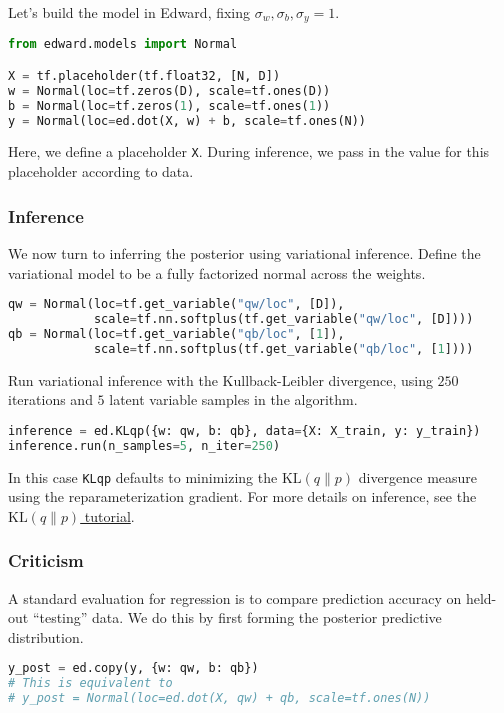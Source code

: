 Let's build the model in Edward, fixing $\sigma_w,\sigma_b,\sigma_y=1$.
\begin{lstlisting}[language=Python]
from edward.models import Normal

X = tf.placeholder(tf.float32, [N, D])
w = Normal(loc=tf.zeros(D), scale=tf.ones(D))
b = Normal(loc=tf.zeros(1), scale=tf.ones(1))
y = Normal(loc=ed.dot(X, w) + b, scale=tf.ones(N))
\end{lstlisting}
Here, we define a placeholder \texttt{X}. During inference, we pass in
the value for this placeholder according to data.

\subsubsection{Inference}

We now turn to inferring the posterior using variational inference.
Define the variational model to be a fully factorized normal across
the weights.
\begin{lstlisting}[language=Python]
qw = Normal(loc=tf.get_variable("qw/loc", [D]),
            scale=tf.nn.softplus(tf.get_variable("qw/loc", [D])))
qb = Normal(loc=tf.get_variable("qb/loc", [1]),
            scale=tf.nn.softplus(tf.get_variable("qb/loc", [1])))
\end{lstlisting}

Run variational inference with the Kullback-Leibler divergence, using
$250$ iterations and $5$ latent variable samples in the algorithm.
\begin{lstlisting}[language=Python]
inference = ed.KLqp({w: qw, b: qb}, data={X: X_train, y: y_train})
inference.run(n_samples=5, n_iter=250)
\end{lstlisting}
In this case \texttt{KLqp} defaults to minimizing the
$\text{KL}(q\|p)$ divergence measure using the reparameterization
gradient.
For more details on inference, see the \href{/tutorials/klqp}{$\text{KL}(q\|p)$ tutorial}.

\subsubsection{Criticism}

A standard evaluation for regression is to compare prediction accuracy on
held-out ``testing'' data. We do this by first forming the posterior predictive
distribution.
\begin{lstlisting}[language=Python]
y_post = ed.copy(y, {w: qw, b: qb})
# This is equivalent to
# y_post = Normal(loc=ed.dot(X, qw) + qb, scale=tf.ones(N))
\end{lstlisting}

